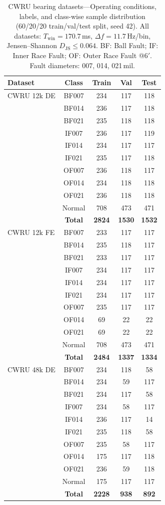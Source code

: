 \documentclass[journal]{IEEEtran}
\begin{document}
\begin{table}[!t]
\centering
\caption{CWRU bearing datasets—Operating conditions, labels, and class-wise sample distribution (60/20/20 train/val/test split, seed 42). All datasets: $T_{\text{win}}=170.7$\,ms, $\Delta f=11.7$\,Hz/bin, Jensen--Shannon $D_{\text{JS}} \leq 0.064$. BF: Ball Fault; IF: Inner Race Fault; OF: Outer Race Fault @6$'$. Fault diameters: 007, 014, 021\,mil.}
\label{tab:datasets_comprehensive}
\small
\renewcommand{\arraystretch}{1.0}
\setlength{\tabcolsep}{5pt}
\begin{tabular}{lcccc}
\toprule
\textbf{Dataset} & \textbf{Class} & \textbf{Train} & \textbf{Val} & \textbf{Test} \\
\midrule
CWRU 12k DE & BF007  & 234 & 117 & 118 \\
 & BF014  & 236 & 117 & 118 \\
 & BF021  & 235 & 118 & 118 \\
 & IF007  & 236 & 117 & 119 \\
 & IF014  & 234 & 117 & 117 \\
 & IF021  & 235 & 117 & 118 \\
 & OF007  & 236 & 118 & 117 \\
 & OF014  & 234 & 118 & 118 \\
 & OF021  & 236 & 118 & 118 \\
 & Normal & 708 & 473 & 471 \\
 & \textbf{Total} & \textbf{2824} & \textbf{1530} & \textbf{1532} \\
\midrule
CWRU 12k FE & BF007  & 233 & 117 & 117 \\
 & BF014  & 235 & 118 & 117 \\
 & BF021  & 233 & 117 & 117 \\
 & IF007  & 234 & 117 & 117 \\
 & IF014  & 234 & 117 & 117 \\
 & IF021  & 234 & 117 & 117 \\
 & OF007  & 235 & 117 & 117 \\
 & OF014  & 69  & 22  & 22  \\
 & OF021  & 69  & 22  & 22  \\
 & Normal & 708 & 473 & 471 \\
 & \textbf{Total} & \textbf{2484} & \textbf{1337} & \textbf{1334} \\
\midrule
CWRU 48k DE & BF007  & 234 & 118 & 58  \\
 & BF014  & 234 & 59  & 117 \\
 & BF021  & 234 & 117 & 58  \\
 & IF007  & 234 & 58  & 117 \\
 & IF014  & 236 & 117 & 14  \\
 & IF021  & 235 & 118 & 58  \\
 & OF007  & 235 & 58  & 117 \\
 & OF014  & 175 & 117 & 118 \\
 & OF021  & 236 & 59  & 118 \\
 & Normal & 175 & 117 & 117 \\
 & \textbf{Total} & \textbf{2228} & \textbf{938}  & \textbf{892}  \\
\bottomrule
\end{tabular}
\end{table}
\end{document}
